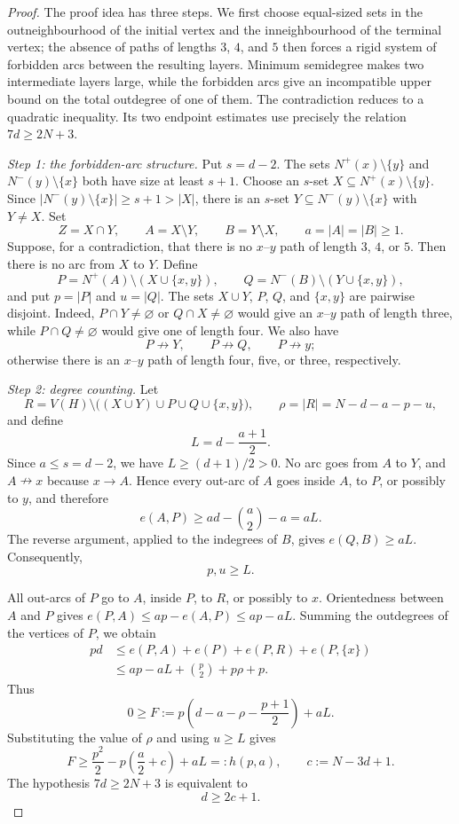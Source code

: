 \documentclass[11pt]{amsart}
\theoremstyle{definition}
\begin{document}
\begin{proof}
The proof idea has three steps.  We first choose equal-sized sets in the
outneighbourhood of the initial vertex and the inneighbourhood of the
terminal vertex; the absence of paths of lengths $3$, $4$, and $5$
then forces a rigid system of forbidden arcs between the resulting
layers.  Minimum semidegree makes two intermediate layers large, while
the forbidden arcs give an incompatible upper bound on the total
outdegree of one of them.  The contradiction reduces to a quadratic
inequality.  Its two endpoint estimates use precisely the relation
$7d\ge2N+3$.

\smallskip
\noindent\emph{Step 1: the forbidden-arc structure.}
Put $s=d-2$.
The sets $N^+(x)\setminus\{y\}$ and $N^-(y)\setminus\{x\}$ both have
size at least $s+1$.  Choose an $s$-set
$X\subseteq N^+(x)\setminus\{y\}$.  Since
$|N^-(y)\setminus\{x\}|\ge s+1>|X|$, there is an $s$-set
$Y\subseteq N^-(y)\setminus\{x\}$ with $Y\ne X$.  Set
\[
  Z=X\cap Y,\qquad A=X\setminus Y,\qquad B=Y\setminus X,
  \qquad a=|A|=|B|\ge1.
\]
Suppose, for a contradiction, that there is no $x$--$y$ path of
length $3$, $4$, or $5$.  Then there is no arc from $X$ to $Y$.
Define
\[
  P=N^+(A)\setminus(X\cup\{x,y\}),\qquad
  Q=N^-(B)\setminus(Y\cup\{x,y\}),
\]
and put $p=|P|$ and $u=|Q|$.  The sets
$X\cup Y$, $P$, $Q$, and $\{x,y\}$ are pairwise disjoint.  Indeed,
$P\cap Y\ne\varnothing$ or $Q\cap X\ne\varnothing$ would give an
$x$--$y$ path of length three, while $P\cap Q\ne\varnothing$ would
give one of length four.  We also have
\[
  P\nrightarrow Y,\qquad P\nrightarrow Q,
  \qquad P\nrightarrow y;
\]
otherwise there is an $x$--$y$ path of length four, five, or three,
respectively.

\smallskip
\noindent\emph{Step 2: degree counting.}
Let
\[
  R=V(H)\setminus\bigl((X\cup Y)\cup P\cup Q\cup\{x,y\}\bigr),
  \qquad \rho=|R|=N-d-a-p-u,
\]
and define
\[
  L=d-\frac{a+1}{2}.
\]
Since $a\le s=d-2$, we have $L\ge(d+1)/2>0$.  No arc goes from $A$ to
$Y$, and $A\nrightarrow x$ because $x\to A$.  Hence every out-arc
of $A$ goes inside $A$, to $P$, or possibly to $y$, and therefore
\[
  e(A,P)\ge ad-\binom a2-a=aL.
\]
The reverse argument, applied to the indegrees of $B$, gives
$e(Q,B)\ge aL$.  Consequently,
\[
  p,u\ge L.
\]

All out-arcs of $P$ go to $A$, inside $P$, to $R$, or possibly to
$x$.  Orientedness between $A$ and $P$ gives
$e(P,A)\le ap-e(A,P)\le ap-aL$.  Summing the outdegrees of the vertices of
$P$, we obtain
\begin{align*}
  pd
  &\le e(P,A)+e(P)+e(P,R)+e(P,\{x\})\\
  &\le ap-aL+\binom p2+p\rho+p.
\end{align*}
Thus
\[
  0\ge F:=p\left(d-a-\rho-\frac{p+1}{2}\right)+aL.
\]
Substituting the value of $\rho$ and using $u\ge L$ gives
\[
  F\ge \frac{p^2}{2}
       -p\left(\frac a2+c\right)+aL
   =:h(p,a),
  \qquad c:=N-3d+1.
\]
The hypothesis $7d\ge2N+3$ is equivalent to
\begin{equation}\label{eq:d-c-relation}
  d\ge2c+1.
\end{equation}


\end{proof}
\end{document}
